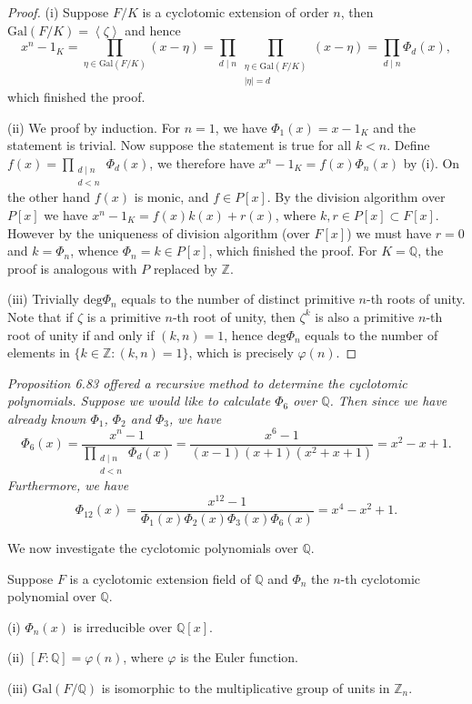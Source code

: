 \begin{proof}
(i) Suppose $F/K$ is a cyclotomic extension of order $n$, then $\mathrm{Gal}(F/K)=\left<\zeta\right>$ and hence 
$$
x^n-1_K=\prod_{\eta \in \mathrm{Gal}\left( F/K \right)}{\left( x-\eta \right)}=\prod_{d\mid n}{\prod_{\substack{\eta \in \mathrm{Gal}\left( F/K \right) \\ \left| \eta \right|=d}}{\left( x-\eta \right)}}=\prod_{d\mid n}{\Phi _d\left( x \right)},
$$
which finished the proof.\par
(ii) We proof by induction. For $n=1$, we have $\Phi_1(x)=x-1_K$ and the statement is trivial. Now suppose the statement is true for all $k<n$. Define $f(x)=\prod_{\substack{d\mid n \\ d<n}}\Phi_d(x)$, we therefore have $x^n-1_K=f(x)\Phi_n(x)$ by (i). On the other hand $f(x)$ is monic, and $f\in P[x]$. By the division algorithm over $P[x]$ we have $x^n-1_K=f(x)k(x)+r(x)$, where $k,r\in P[x]\subset F[x]$. However by the uniqueness of division algorithm (over $F[x]$) we must have $r=0$ and $k=\Phi_n$, whence $\Phi_n=k\in P[x]$, which finished the proof. For $K=\mathbb{Q}$, the proof is analogous with $P$ replaced by $\mathbb{Z}$.\par
(iii) Trivially $\mathrm{deg}\Phi_n$ equals to the number of distinct primitive $n$-th roots of unity. Note that if $\zeta$ is a primitive $n$-th root of unity, then $\zeta^k$ is also a primitive $n$-th root of unity if and only if $(k,n)=1$, hence $\mathrm{deg}\Phi_n$ equals to the number of elements in $\{k\in\mathbb{Z}:(k,n)=1\}$, which is precisely $\varphi(n)$.
\end{proof}
\begin{note}\em
Proposition 6.83 offered a recursive method to determine the cyclotomic polynomials. Suppose we would like to calculate $\Phi_6$ over $\mathbb{Q}$. Then since we have already known $\Phi_1$, $\Phi_2$ and $\Phi_3$, we have 
$$
\Phi _6\left( x \right) =\frac{x^n-1}{\prod_{\substack{d\mid n \\ d<n}}{\Phi _d\left( x \right)}}=\frac{x^6-1}{\left( x-1 \right) \left( x+1 \right) \left( x^2+x+1 \right)}=x^2-x+1.
$$
Furthermore, we have 
$$
\Phi _{12}\left( x \right) =\frac{x^{12}-1}{\Phi _1\left( x \right) \Phi _2\left( x \right) \Phi _3\left( x \right) \Phi _6\left( x \right)}=x^4-x^2+1.
$$
\end{note}
We now investigate the cyclotomic polynomials over $\mathbb{Q}$.
\begin{proposition}
Suppose $F$ is a cyclotomic extension field of $\mathbb{Q}$ and $\Phi_n$ the $n$-th cyclotomic polynomial over $\mathbb{Q}$.\par
(i) $\Phi_n(x)$ is irreducible over $\mathbb{Q}[x]$.\par
(ii) $[F:\mathbb{Q}]=\varphi(n)$, where $\varphi$ is the Euler function.\par
(iii) $\mathrm{Gal}(F/\mathbb{Q})$ is isomorphic to the multiplicative group of units in $\mathbb{Z}_n$.
\end{proposition}
